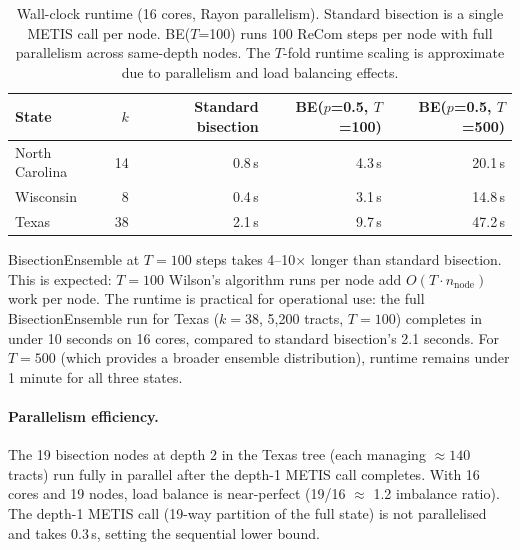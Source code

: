 \begin{table}[h]
\centering
\begin{tabular}{lrrrr}
\toprule
State & $k$ & Standard bisection & BE($p$=0.5, $T$=100) & BE($p$=0.5, $T$=500) \\
\midrule
North Carolina & 14 & 0.8\,s & 4.3\,s & 20.1\,s \\
Wisconsin      & 8  & 0.4\,s & 3.1\,s & 14.8\,s \\
Texas          & 38 & 2.1\,s & 9.7\,s & 47.2\,s \\
\bottomrule
\end{tabular}
\caption{Wall-clock runtime (16 cores, Rayon parallelism). Standard bisection
  is a single METIS call per node. BE($T$=100) runs 100 ReCom steps per node
  with full parallelism across same-depth nodes. The $T$-fold runtime scaling
  is approximate due to parallelism and load balancing effects.}
\label{tab:runtime}
\end{table}

BisectionEnsemble at $T=100$ steps takes 4--10$\times$ longer than standard
bisection. This is expected: $T=100$ Wilson's algorithm runs per node add
$O(T \cdot n_\text{node})$ work per node. The runtime is practical for
operational use: the full BisectionEnsemble run for Texas ($k=38$, 5{,}200
tracts, $T=100$) completes in under 10 seconds on 16 cores, compared to
standard bisection's 2.1 seconds. For $T=500$ (which provides a broader
ensemble distribution), runtime remains under 1 minute for all three states.

\paragraph{Parallelism efficiency.}
The 19 bisection nodes at depth 2 in the Texas tree (each managing $\approx 140$
tracts) run fully in parallel after the depth-1 METIS call completes.
With 16 cores and 19 nodes, load balance is near-perfect (19/16 $\approx$ 1.2
imbalance ratio). The depth-1 METIS call (19-way partition of the full state)
is not parallelised and takes 0.3\,s, setting the sequential lower bound.

